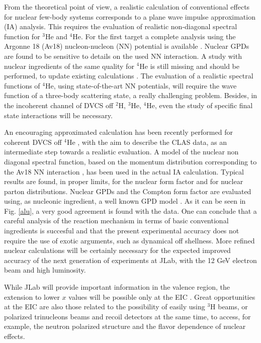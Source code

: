 From the theoretical point of view, a realistic calculation 
of conventional effects for
nuclear few-body systems corresponds to a plane wave impulse approximation 
(IA) analysis. This requires the evaluation of realistic non-diagonal spectral
function for $^3$He and $^4$He.
For the first target a complete analysis using the Argonne 18 (Av18)
nucleon-nucleon (NN) potential is available
\cite{Scopetta:2004kj,Scopetta:2009sn,Rinaldi:2012pj,
Rinaldi:2012ft,Rinaldi:2014bba}.
Nuclear GPDs are found to be sensitive to details on 
the used NN interaction.
A study with nuclear ingredients of the same quality
for $^4$He is still missing and should be performed, to update 
existing calculations \cite{Guzey:2003jh,Liuti:2005gi}. 
The evaluation of a realistic spectral functions of $^4$He,
using state-of-the-art NN potentials,
will require the wave function of a three-body scattering state, 
a really challenging problem.
Besides, in the incoherent channel of DVCS off $^2$H, $^3$He, $^4$He,
even the study of specific final state interactions will be necessary.

An encouraging approximated calculation has been recently
performed for coherent DVCS off $^4$He \cite{sara}, with the aim to
describe the CLAS data, as an intermediate
step towards a realistic evaluation.
A model of the nuclear non diagonal spectral function, 
based on the momentum distribution
corresponding to the Av18 NN interaction
\cite{vivia}, has been used in the 
actual IA
calculation. Typical results
are found, in proper limits, for the nuclear form factor
and for nuclear parton distributions.
Nuclear GPDs and the
Compton form factor are evaluated using, as nucleonic ingredient,
a well known GPD model \cite{gk}. 
As it can be seen in Fig. \ref{alu}, a very good agreement 
is found with the data.  
One can conclude that 
a careful analysis of the reaction mechanism in terms of
basic conventional ingredients is succesful and that
the present experimental accuracy does not require
the use of exotic arguments, such as dynamical off shellness.
More refined nuclear calculations will be certainly necessary for 
the expected improved accuracy of the next generation of experiments 
at JLab, with the 12 GeV electron beam and high luminosity. 
  
While JLab will provide important information
in the valence region, the extension to lower
$x$ values will be possible only at the EIC \cite{Accardi:2012qut}. 
Great opportunities at the EIC are also those related to the possibility
of easily using $^3$H beams, or polarized trinucleons beams and 
recoil detectors at the same time, to access, for example, 
the neutron polarized structure and the flavor dependence 
of nuclear effects.





